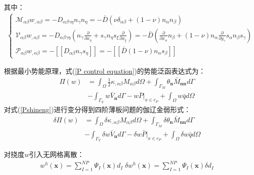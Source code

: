 其中：
\begin{equation}
\begin{split}\label{MVP1}
    \begin{cases}
 \mathcal{M}_{\alpha\beta}w_{,\alpha\beta}=-D_{\alpha\beta\gamma\eta}n_{\gamma}n_{\eta}=-\bar{D}(\nu\delta_{\alpha\beta}+(1-\nu)n_{\alpha}n_{\beta})\\
  \mathcal{V}_{\alpha\beta}w_{,\alpha\beta}=-D_{\alpha\beta\gamma\eta}(n_{\gamma}\frac{\partial}{\partial x_{\eta}}+s_{\gamma}n_{\eta}s_{\xi}\frac{\partial}{\partial x_{\xi}})=-\bar{D}(\frac{\partial}{\partial x_{\alpha}}n_{\beta}+(1-\nu)n_{\alpha}\frac{\partial}{\partial y_{\gamma}}s_{\alpha}n_{\beta}s_{\gamma})\\
 \mathcal{P}_{\alpha\beta}w_{,\alpha\beta}=-[[D_{\alpha\beta}n_{\gamma}s_{\eta}]]=-[[\bar{D}(1-\nu)n_{\alpha}s_{\beta}]]
    \end{cases}
\end{split}
\end{equation}\par
根据最小势能原理，式(\ref{P control equation})的势能泛函表达式为：
\begin{equation}\label{Pshineng}
\begin{split}
    \Pi(w)&=\int_{\Omega}\frac{1}{2}\kappa_{,\alpha\beta}M_{\alpha\beta}d\Omega+\int_{\Gamma_M}\theta_{\pmb{n}}\bar{M}_{\pmb{nn}}d\Gamma\\
    &-\int_{\Gamma_V}w\bar{V}_{\pmb{n}}d\Gamma-w\bar{P}\vert_{x\in c_P}+\int_{\Omega}w\bar{q}d\Omega
\end{split}
\end{equation}
对式(\ref{Pshineng})进行变分得到四阶薄板问题的伽辽金弱形式：
\begin{equation}\label{Pweakform}
\begin{split}
        \delta\Pi(w)&=\int_{\Omega}\delta\kappa_{,\alpha\beta}M_{\alpha\beta}d\Omega+\int_{\Gamma_M}\delta\theta_{\pmb{n}}\bar{M}_{\pmb{nn}}d\Gamma\\
        &-\int_{\Gamma_V}\delta w\bar{V}_{\pmb{n}}d\Gamma-\delta w\bar{P}\vert_{x\in c_P}+\int_{\Omega}\delta w\bar{q}d\Omega
\end{split}
\end{equation}\par
对挠度$w$引入无网格离散：
\begin{equation}
\begin{split}\label{Pwuwangelisan}
    w^h(\pmb{x})=\sum_{I=1}^{N\!P}\Psi_I(\pmb{x})d_I \;\delta w^h(\pmb{x})=\sum_{I=1}^{N\!P}\Psi_I(\pmb{x})\delta d_I\\
\end{split}
\end{equation}
